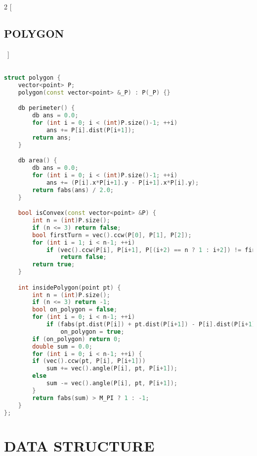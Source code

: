 \documentclass[leter]{amsart}
\begin{document}
\begin{multicols}{2}
[\subsection{POLYGON}\ ]
\begin{lstlisting}[language=C++]

struct polygon {
    vector<point> P;
    polygon(const vector<point> &_P) : P(_P) {}

    db perimeter() {
        db ans = 0.0;
        for (int i = 0; i < (int)P.size()-1; ++i)
            ans += P[i].dist(P[i+1]);
        return ans;
    }

    db area() {
        db ans = 0.0;
        for (int i = 0; i < (int)P.size()-1; ++i)
            ans += (P[i].x*P[i+1].y - P[i+1].x*P[i].y);
        return fabs(ans) / 2.0;
    }

    bool isConvex(const vector<point> &P) {
        int n = (int)P.size();
        if (n <= 3) return false;
        bool firstTurn = vec().ccw(P[0], P[1], P[2]);
        for (int i = 1; i < n-1; ++i)
            if (vec().ccw(P[i], P[i+1], P[(i+2) == n ? 1 : i+2]) != firstTurn)
                return false;
        return true; 
    }

    int insidePolygon(point pt) {
        int n = (int)P.size();
        if (n <= 3) return -1;
        bool on_polygon = false;
        for (int i = 0; i < n-1; ++i)
            if (fabs(pt.dist(P[i]) + pt.dist(P[i+1]) - P[i].dist(P[i+1])) < EPS)
                on_polygon = true;
        if (on_polygon) return 0;
        double sum = 0.0;
        for (int i = 0; i < n-1; ++i) {
        if (vec().ccw(pt, P[i], P[i+1]))
            sum += vec().angle(P[i], pt, P[i+1]);
        else
            sum -= vec().angle(P[i], pt, P[i+1]);
        }
        return fabs(sum) > M_PI ? 1 : -1;
    }
};


\end{lstlisting}
\end{multicols}
\enlargethispage*{\baselineskip}\section{DATA STRUCTURE}
\end{document}
